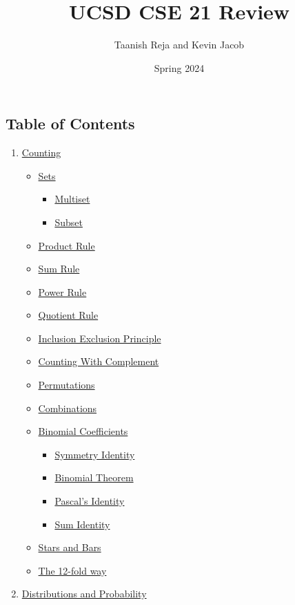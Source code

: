 \documentclass{article}
\title{UCSD CSE 21 Review}
\author{Taanish Reja and Kevin Jacob}
\date{Spring 2024}
\begin{document}
\begin{spacing}{1.5}
\maketitle
\newpage

\section*{Table of Contents}

\begin{enumerate}
\item \hyperref[sec:counting]{Counting}
\begin{itemize}
\item \hyperref[sec:sets]{Sets}
\begin{itemize}
\item \hyperref[sec:multiset]{Multiset}
\item \hyperref[sec:subset]{Subset}
\end{itemize}
\item \hyperref[sec:product]{Product Rule}
\item \hyperref[sec:sum]{Sum Rule}
\item \hyperref[sec:power]{Power Rule}
\item \hyperref[sec:quotient]{Quotient Rule}
\item \hyperref[sec:inclusionexclusion]{Inclusion Exclusion Principle}
\item \hyperref[sec:complement]{Counting With Complement}
\item \hyperref[sec:permutations]{Permutations}
\item \hyperref[sec:combinations]{Combinations}
\item \hyperref[sec:binomial]{Binomial Coefficients}
\begin{itemize}
    \item \hyperref[sec:symmetry]{Symmetry Identity}
    \item \hyperref[sec:btheorem]{Binomial Theorem}
    \item \hyperref[sec:pascal]{Pascal's Identity}
    \item \hyperref[sec:sidentity]{Sum Identity}
\end{itemize}
\item \hyperref[sec:starsbars]{Stars and Bars}
\item \hyperref[sec:12fold]{The 12-fold way}
\end{itemize}
\newpage
\item \hyperref[sec:probability]{Distributions and Probability}

\end{enumerate}
\end{spacing}
\end{document}
